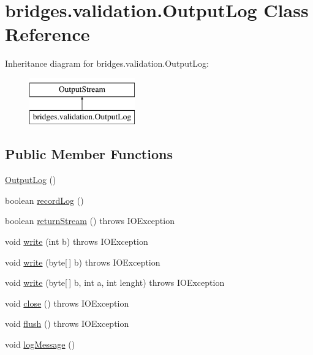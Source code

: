 \hypertarget{classbridges_1_1validation_1_1_output_log}{}\section{bridges.\+validation.\+Output\+Log Class Reference}
\label{classbridges_1_1validation_1_1_output_log}
Inheritance diagram for bridges.\+validation.\+Output\+Log\+:\begin{figure}[H]
\begin{center}
\leavevmode
\includegraphics[height=2.000000cm]{classbridges_1_1validation_1_1_output_log}
\end{center}
\end{figure}
\subsection*{Public Member Functions}
\begin{DoxyCompactItemize}
\item 
\mbox{\hyperlink{classbridges_1_1validation_1_1_output_log_a47a7efee1dce6f11f3de83d48994a56f}{Output\+Log}} ()
\item 
boolean \mbox{\hyperlink{classbridges_1_1validation_1_1_output_log_aae5e41b4b23adb56e3c97d2c17ad0768}{record\+Log}} ()
\item 
boolean \mbox{\hyperlink{classbridges_1_1validation_1_1_output_log_a4ec6037db31ff9dc0664d341183f296f}{return\+Stream}} ()  throws I\+O\+Exception
\item 
void \mbox{\hyperlink{classbridges_1_1validation_1_1_output_log_a68ed2055f1a0626674675354feeb9d54}{write}} (int b)  throws I\+O\+Exception 
\item 
void \mbox{\hyperlink{classbridges_1_1validation_1_1_output_log_a6489f70aa4e2903456ed05315dd59f31}{write}} (byte\mbox{[}$\,$\mbox{]} b)  throws I\+O\+Exception 
\item 
void \mbox{\hyperlink{classbridges_1_1validation_1_1_output_log_ad0ada8f6ff72218f18b64672690fc94f}{write}} (byte\mbox{[}$\,$\mbox{]} b, int a, int lenght)  throws I\+O\+Exception 
\item 
void \mbox{\hyperlink{classbridges_1_1validation_1_1_output_log_a6ab7881cd35aa11cc830dab4732fe66d}{close}} ()  throws I\+O\+Exception
\item 
void \mbox{\hyperlink{classbridges_1_1validation_1_1_output_log_ab810fd1e3d7e939bcdf1ec38978c02cd}{flush}} ()  throws I\+O\+Exception
\item 
void \mbox{\hyperlink{classbridges_1_1validation_1_1_output_log_aea898d0de8715c1451d4731f3d9ae91d}{log\+Message}} ()
\end{DoxyCompactItemize}
